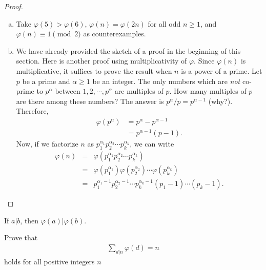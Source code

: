 \documentclass[12pt]{subfile}
\begin{document}
\begin{proof}
\begin{enumerate}[(a)]
				\item Take $\varphi(5)>\varphi(6)$, $\varphi(n)=\varphi(2n)$ for all odd $n\geq 1$, and $\varphi(n) \equiv 1 \pmod 2$ as counterexamples.

				\item We have already provided the sketch of a proof in the beginning of this section. Here is another proof using multiplicativity of $\varphi$. Since $\varphi(n)$ is multiplicative, it suffices to prove the result when $n$ is a power of a prime. Let $p$ be a prime and $\alpha \geq 1$ be an integer. The only numbers which are \textit{not} co-prime to $p^\alpha$ between $1,2,\cdots,p^\alpha$ are multiples of $p$. How many multiples of $p$ are there among these numbers? The answer is $p^\alpha/p=p^{\alpha-1}$ (why?). Therefore,
					\begin{align*}
						\varphi(p^\alpha) &= p^\alpha - p^{\alpha -1}\\
						&= p^{\alpha -1} (p-1).
					\end{align*}
				Now, if we factorize $n$ as $p_1^{\alpha_1} p_2^{\alpha_2} \cdots p_k^{\alpha_k}$, we can write
					\begin{eqnarray*}
						\varphi(n) &=& \varphi(p_1^{\alpha_1} p_2^{\alpha_2} \cdots p_k^{\alpha_k})\\
								   &=& \varphi(p_1^{\alpha_1}) \varphi(p_2^{\alpha_2}) \cdots \varphi(p_k^{\alpha_k})\\
								   &=& p_1^{\alpha_1-1} p_2^{\alpha_2-1} \cdots p_k^{\alpha_k-1} \left( p_1 -1 \right) \cdots \left( p_k -1 \right).
					\end{eqnarray*}
			\end{enumerate}
		\end{proof}

		\begin{corollary}\label{cor:phidiv}
			If $a|b$, then $\varphi(a)|\varphi(b)$.
		\end{corollary}

		\begin{theorem}\label{thm:phi*1}
			Prove that
				\begin{align*}
					\sum_{d|n} \varphi(d)=n
				\end{align*}
			holds for all positive integers $n$
		\end{theorem}
\end{document}
